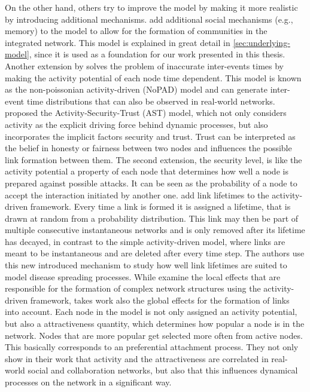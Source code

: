 On the other hand, others try to improve the model by making it more realistic by introducing additional mechanisms.
\citet{Laurent2015} add additional social mechanisms (e.g., memory) to the model to allow for the formation of communities in the integrated network.
This model is explained in great detail in \cref{sec:underlying-model}, since it is used as a foundation for our work presented in this thesis.
Another extension by \citet{Moinet2015, Moinet2016} solves the problem of inaccurate inter-events times by making the activity potential of each node time dependent.
This model is known as the non-poissonian activity-driven (NoPAD) model and can generate inter-event time distributions that can also be observed in real-world networks.
\citet{Wang2016} proposed the Activity-Security-Trust (AST) model, which not only considers activity as the explicit driving force behind dynamic processes, but also incorporates the implicit factors security and trust.
Trust can be interpreted as the belief in honesty or fairness between two nodes and influences the possible link formation between them.
The second extension, the security level, is like the activity potential a property of each node that determines how well a node is prepared against possible attacks.
It can be seen as the probability of a node to accept the interaction initiated by another one.
\citet{Sunny2015} add link lifetimes to the activity-driven framework.
Every time a link is formed it is assigned a lifetime, that is drawn at random from a probability distribution.
This link may then be part of multiple consecutive instantaneous networks
and is only removed after its lifetime has decayed, in contrast to the simple activity-driven model, where links are meant to be instantaneous and are deleted after every time step.
The authors use this new introduced mechanism to study how well link lifetimes are suited to model disease spreading processes.
While \citet{Laurent2015} examine the local effects that are responsible for the formation of complex network structures using the activity-driven framework, takes \citet{Alessandretti2017} work also the global effects for the formation of links into account.
Each node in the model is not only assigned an activity potential, but also a attractiveness quantity, which determines how popular a node is in the network.
Nodes that are more popular get selected more often from active nodes.
This basically corresponds to an preferential attachment process.
They not only show in their work that activity and the attractiveness are correlated in real-world social and collaboration networks, but also that this influences dynamical processes on the network in a significant way.


